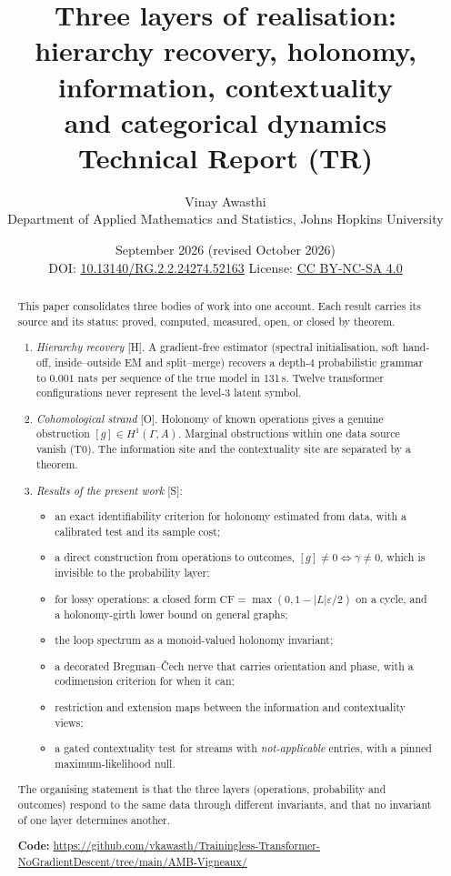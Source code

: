 \documentclass[11pt]{article}
\title{Three layers of realisation:\\ hierarchy recovery, holonomy, information, contextuality\\ and categorical dynamics\\[4pt] \large Technical Report (TR)}
\author{Vinay Awasthi\\ \small Department of Applied Mathematics and Statistics, Johns Hopkins University}
\date{\small September 2026 (revised October 2026)\\[2pt]
DOI: \href{https://doi.org/10.13140/RG.2.2.24274.52163}{10.13140/RG.2.2.24274.52163}\quad
License: \href{https://creativecommons.org/licenses/by-nc-sa/4.0/}{CC BY-NC-SA 4.0}}
\theoremstyle{definition}
\theoremstyle{remark}
\newcommand{\CF}{\mathrm{CF}}
\newcommand{\src}[1]{\textsf{\small[#1]}}
\begin{document}
\maketitle

\begin{abstract}
This paper consolidates three bodies of work into one account. Each result carries its source and its status: proved, computed, measured, open, or closed by theorem.
\begin{enumerate}
  \item \emph{Hierarchy recovery} \src{H}. A gradient-free estimator (spectral initialisation, soft hand-off, inside--outside EM and split--merge) recovers a depth-4 probabilistic grammar to $0.001$ nats per sequence of the true model in 131\,s. Twelve transformer configurations never represent the level-3 latent symbol.
  \item \emph{Cohomological strand} \src{O}. Holonomy of known operations gives a genuine obstruction $[g]\in H^1(\Gamma,A)$. Marginal obstructions within one data source vanish (T0). The information site and the contextuality site are separated by a theorem.
  \item \emph{Results of the present work} \src{S}:
  \begin{itemize}
    \item an exact identifiability criterion for holonomy estimated from data, with a calibrated test and its sample cost;
    \item a direct construction from operations to outcomes, $[g]\ne0\iff\gamma\ne0$, which is invisible to the probability layer;
    \item for lossy operations: a closed form $\CF=\max(0,1-|L|\varepsilon/2)$ on a cycle, and a holonomy-girth lower bound on general graphs;
    \item the loop spectrum as a monoid-valued holonomy invariant;
    \item a decorated Bregman--\v{C}ech nerve that carries orientation and phase, with a codimension criterion for when it can;
    \item restriction and extension maps between the information and contextuality views;
    \item a gated contextuality test for streams with \emph{not-applicable} entries, with a pinned maximum-likelihood null.
  \end{itemize}
\end{enumerate}
The organising statement is that the three layers (operations, probability and outcomes) respond to the same data through different invariants, and that no invariant of one layer determines another.
\par\smallskip\noindent\textbf{Code:} \url{https://github.com/vkawasth/Trainingless-Transformer-NoGradientDescent/tree/main/AMB-Vigneaux/}
\end{abstract}
\end{document}
